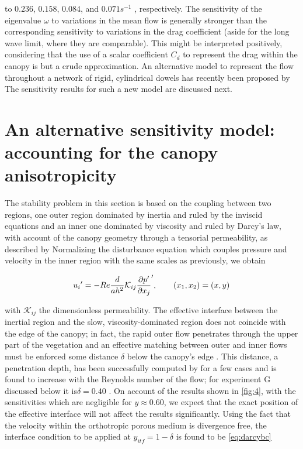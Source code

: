to $0.236$, $0.158$, $0.084$, and $0.071 s^{-1}$ , respectively. The sensitivity of the eigenvalue $\omega$ to variations
in the mean flow is generally stronger than the corresponding sensitivity to variations in the drag
coefficient (aside for the long wave limit, where they are comparable). This might be interpreted
positively, considering that the use of a scalar coefficient $C_d$ to represent the drag within the canopy
is but a crude approximation. An alternative model to represent the flow throughout a network of
rigid, cylindrical dowels has recently been proposed by \citet{zampogna2016instability} The sensitivity results for
such a new model are discussed next.


\section{An alternative sensitivity model: accounting for the canopy anisotropicity}
\label{sec:4}

The stability problem in this section is based on the coupling between two regions, one outer
region dominated by inertia and ruled by the inviscid equations and an inner one dominated by
viscosity and ruled by Darcy’s law, with account of the canopy geometry through a tensorial
permeability, as described by \citet{zampogna2016instability} Normalizing the disturbance equation which couples
pressure and velocity in the inner region with the same scales as previously, we obtain

\begin{equation}
{u_i}' = -Re \dfrac{d}{ah^2} \mathcal{K}_{ij} \dfrac{\partial p'}{\partial {}x_j}',  \qquad (x_1, x_2) = (x,y)
\label{eq:darcy}
\end{equation}


with $\mathcal{K}_{ij}$ the dimensionless permeability. The effective interface between the inertial region and the
slow, viscosity-dominated region does not coincide with the edge of the canopy; in fact, the rapid
outer flow penetrates through the upper part of the vegetation and an effective matching between
outer and inner flows must be enforced some distance $\delta$ below the canopy’s edge \citet{le2006interfacial}.  This distance,
a penetration depth, has been successfully computed by \citet{zampogna2016fluid} for a few cases
and is found to increase with the Reynolds number of the flow; for experiment G discussed below it
is$ \delta = 0.40$ \citet{zampognaprivate}. On account of the results shown in \ref{fig:4}, with the sensitivities which are negligible
for $y \approx 0.60$, we expect that the exact position of the effective interface will not affect the results
significantly.
Using the fact that the velocity within the orthotropic porous medium is divergence free, the
interface condition to be applied at $y_{itf} = 1 - \delta$ is found to be \ref{eq:darcybc}

